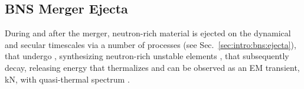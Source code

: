 
\subsection{\ac{BNS} Merger Ejecta}





During and after the merger, neutron-rich material is ejected on the 
dynamical \citep{Rosswog:1998hy,Hotokezaka:2013b,Bauswein:2013yna,Wanajo:2014wha,Radice:2018pdn} 
and secular \citep{Lee:2009,Perego:2014fma,Fernandez:2015use,Siegel:2017nub,Fujibayashi:2017puw,Fernandez:2018kax,Miller:2019dpt} 
timescales via a number of processes (see Sec.~\ref{sec:intro:bns:ejecta}), that 
undergo \rproc{} \nuc{}, synthesizing neutron-rich unstable elements 
\citep{Eichler:1989ve,Wanajo:2014wha,Cowan:2019pkx},
that subsequently decay, releasing energy that thermalizes and can be observed as 
an \ac{EM} transient, \ac{kN}, with quasi-thermal spectrum \citep{Metzger:2019zeh}. 
%

